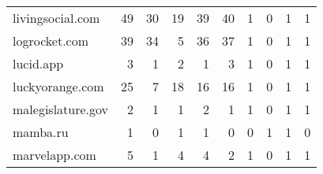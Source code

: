 \begin{tabular}{lrrrrrrrrr}
           livingsocial.com &                               49 &                                 30 &                                     19 &                           39 &                          40 &                                   1 &                                      0 &                             1 &                            1 \\
              logrocket.com &                               39 &                                 34 &                                      5 &                           36 &                          37 &                                   1 &                                      0 &                             1 &                            1 \\
                  lucid.app &                                3 &                                  1 &                                      2 &                            1 &                           3 &                                   1 &                                      0 &                             1 &                            1 \\
            luckyorange.com &                               25 &                                  7 &                                     18 &                           16 &                          16 &                                   1 &                                      0 &                             1 &                            1 \\
          malegislature.gov &                                2 &                                  1 &                                      1 &                            2 &                           1 &                                   1 &                                      0 &                             1 &                            1 \\
                   mamba.ru &                                1 &                                  0 &                                      1 &                            1 &                           0 &                                   0 &                                      1 &                             1 &                            0 \\
              marvelapp.com &                                5 &                                  1 &                                      4 &                            4 &                           2 &                                   1 &                                      0 &                             1 &                            1 \\

\end{tabular}
